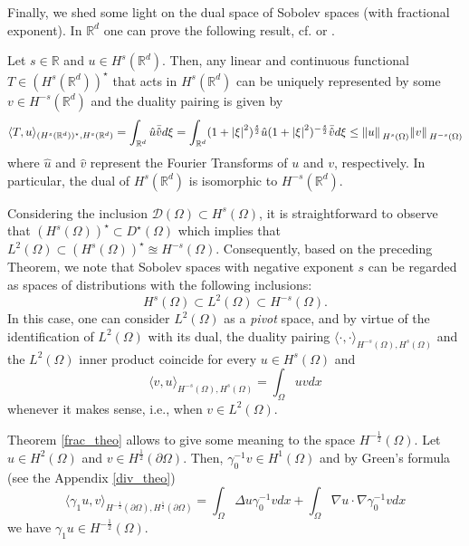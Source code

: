 Finally, we shed some light on the dual space of Sobolev spaces (with fractional exponent). In \(\mathbb{R}^d\) one can prove the following result, cf. \cite{chen2010boundary} or \cite{hormander2015analysis}.
\begin{theorem}
    Let \(s \in \mathbb{R}\) and \(u \in H^s(\mathbb{R}^d)\). Then, any linear and continuous functional \(T \in (H^s(\mathbb{R}^d))^\star\) that acts in \(H^s(\mathbb{R}^d)\) can be uniquely represented by some \(v \in H^{-s}(\mathbb{R}^d)\) and the duality pairing is given by
    \[
        \langle T, u \rangle_{(H^s(\mathbb{R}^d))^\star, H^s(\mathbb{R}^d)} = \int_{\mathbb{R}^d} \hat{u} \bar{\hat{v}}d \xi = \int_{\mathbb{R}^d} (1+ \abs{\xi}^2)^{\frac{s}{2}}\hat{u}(1+ \abs{\xi}^{2})^{-\frac{s}{2}}\bar{\hat{v}}d \xi \leq \norm*{u}_{H^s(\Omega)}\norm*{v}_{H^{-s}(\Omega)}
    \]
    where \(\hat{u}\) and \(\hat{v}\) represent the Fourier Transforms of \(u\) and \(v\), respectively. In particular, the dual of \(H^s(\mathbb{R}^d)\) is isomorphic to \(H^{-s}(\mathbb{R}^d)\).
\end{theorem}
\begin{remark}\label{preliminaries_chapter_duality_pairing_def_remark}
    Considering the inclusion \(\mathcal{D}(\Omega) \subset H^s(\Omega)\), it is straightforward to observe that \((H^s(\Omega))^\star \subset D^\star(\Omega)\) which implies that \(L^2(\Omega) \subset (H^{s}(\Omega))^\star \approxeq H^{-s}(\Omega)\). Consequently, based on the preceding Theorem, we note that Sobolev spaces with negative exponent \(s\) can be regarded as spaces of distributions with the following inclusions:
    \[
        H^{s}(\Omega) \subset L^2(\Omega) \subset H^{-s}(\Omega).
    \]
    In this case, one can consider \(L^2(\Omega)\) as a \textit{pivot} space, and by virtue of the identification of \(L^2(\Omega)\) with its dual, the duality pairing \(\langle \cdot, \cdot \rangle_{H^{-s}(\Omega), H^s(\Omega)}\) and the \(L^2(\Omega)\) inner product coincide for every \(u \in H^s(\Omega)\) and
    \begin{equation}\label{preliminaries_chapter_duality_pairing_def}
        \langle v, u \rangle_{H^{-s}(\Omega), H^s(\Omega)} = \int_{\Omega} u v dx
    \end{equation}
    whenever it makes sense, i.e., when \(v \in L^2(\Omega)\).
\end{remark}

Theorem \ref{frac_theo} allows to give some meaning to the space \(H^{-\frac{1}{2}}(\Omega)\). Let \(u \in H^2(\Omega)\) and \(v \in H^\frac{1}{2}(\partial\Omega)\). Then, \(\gamma_0^{-1}v \in H^1(\Omega)\) and by Green's formula (see the Appendix \ref{div_theo})
\[
    \langle \gamma_1 u, v \rangle_{H^{-\frac{1}{2}}(\partial\Omega), H^{\frac{1}{2}}(\partial\Omega)} = \int_\Omega \Delta u \gamma_0^{-1}v dx + \int_\Omega \nabla u \cdot \nabla \gamma_0^{-1}v dx
\]
we have \(\gamma_1 u \in H^{-\frac{1}{2}}(\Omega)\).

